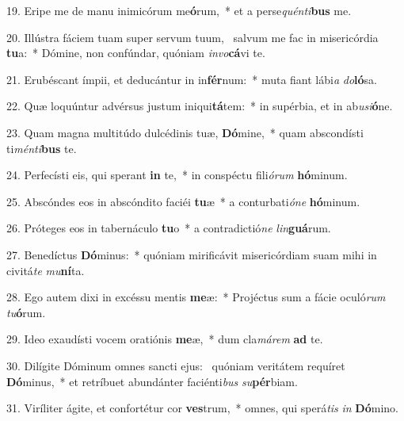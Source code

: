 19. Eripe me de manu inimicórum me\textbf{ó}rum,~*  et a perse\textit{quén}\textit{ti}\textbf{bus} me.\

20. Illústra fáciem tuam super servum tuum, \dag\  salvum me fac in misericórdia \textbf{tu}a:~*  Dómine, non confúndar, quóniam \textit{in}\textit{vo}\textbf{cá}vi te.\

21. Erubéscant ímpii, et deducántur in in\textbf{fér}num:~*  muta fiant lábi\textit{a} \textit{do}\textbf{ló}sa.\

22. Quæ loquúntur advérsus justum iniqui\textbf{tá}tem:~*  in supérbia, et in ab\textit{u}\textit{si}\textbf{ó}ne.\

23. Quam magna multitúdo dulcédinis tuæ, \textbf{Dó}mine,~*  quam abscondísti ti\textit{mén}\textit{ti}\textbf{bus} te.\

24. Perfecísti eis, qui sperant \textbf{in} te,~*  in conspéctu fili\textit{ó}\textit{rum} \textbf{hó}minum.\

25. Abscóndes eos in abscóndito faciéi \textbf{tu}æ~*  a conturbati\textit{ó}\textit{ne} \textbf{hó}minum.\

26. Próteges eos in tabernáculo \textbf{tu}o~*  a contradictió\textit{ne} \textit{lin}\textbf{guá}rum.\

27. Benedíctus \textbf{Dó}minus:~*  quóniam mirificávit misericórdiam suam mihi in civitá\textit{te} \textit{mu}\textbf{ní}ta.\

28. Ego autem dixi in excéssu mentis \textbf{me}æ:~*  Projéctus sum a fácie oculó\textit{rum} \textit{tu}\textbf{ó}rum.\

29. Ideo exaudísti vocem oratiónis \textbf{me}æ,~*  dum cla\textit{má}\textit{rem} \textbf{ad} te.\

30. Dilígite Dóminum omnes sancti ejus: \dag\  quóniam veritátem requíret \textbf{Dó}minus,~*  et retríbuet abundánter faciénti\textit{bus} \textit{su}\textbf{pér}biam.\

31. Viríliter ágite, et confortétur cor \textbf{ves}trum,~*  omnes, qui sperá\textit{tis} \textit{in} \textbf{Dó}mino.\

